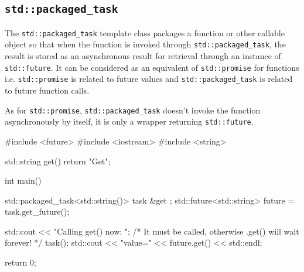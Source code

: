 \documentclass[../main]{subfiles}
\begin{document}
\subsection{\texttt{std::packaged\_task}}
    The \texttt{std::packaged\_task} template class packages a function
or other callable object so that when the function is invoked
through \texttt{std::packaged\_task}, the result is stored as an
asynchronous result for retrieval through an instance of \texttt{std::future}.
It can be considered as an equivalent of \texttt{std::promise} for
functions i.e. \texttt{std::promise} is related to future values and
\texttt{std::packaged\_task} is related to future function calls.\newline

    As for \texttt{std::promise}, \texttt{std::packaged\_task}
doesn't invoke the function asynchronously by itself, it is only a wrapper
returning \texttt{std::future}.
\begin{Code}
    #include <future>
    #include <iostream>
    #include <string>

    std::string get() { return "Get"; }

    int main()
    {
        std::packaged_task<std::string()> task { &get };
        std::future<std::string> future = task.get_future();

        std::cout << "Calling get() now: ";
        /* It must be called, otherwise .get() will wait forever! */
        task();
        std::cout << "value=" << future.get() << std::endl;

        return 0;
    }
\end{Code}
\end{document}
